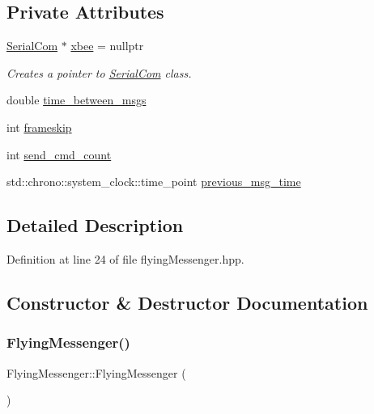 \subsection*{Private Attributes}
\begin{DoxyCompactItemize}
\item 
\hyperlink{class_serial_com}{Serial\+Com} $\ast$ \hyperlink{class_flying_messenger_a419820a45ea2bc496c10bf36b7b49033}{xbee} = nullptr
\begin{DoxyCompactList}\small\item\em Creates a pointer to \hyperlink{class_serial_com}{Serial\+Com} class. \end{DoxyCompactList}\item 
double \hyperlink{class_flying_messenger_a78023f5c0e3ee9242e0101d40f2a0d3c}{time\+\_\+between\+\_\+msgs}
\item 
int \hyperlink{class_flying_messenger_af2bf887194a8483cbadb5e27d2ec6b58}{frameskip}
\item 
int \hyperlink{class_flying_messenger_ac9ea18cccb4b2495daa5f90ba5aff1ab}{send\+\_\+cmd\+\_\+count}
\item 
std\+::chrono\+::system\+\_\+clock\+::time\+\_\+point \hyperlink{class_flying_messenger_af8611988cd9ba1712ae9e18c7adf0e6c}{previous\+\_\+msg\+\_\+time}
\end{DoxyCompactItemize}


\subsection{Detailed Description}


Definition at line 24 of file flying\+Messenger.\+hpp.



\subsection{Constructor \& Destructor Documentation}
\mbox{\label{class_flying_messenger_af9b7f5eb0e17e3c3cbf41ce14554f19b}} 
\subsubsection{\texorpdfstring{Flying\+Messenger()}{FlyingMessenger()}}
{\footnotesize\ttfamily Flying\+Messenger\+::\+Flying\+Messenger (\begin{DoxyParamCaption}{ }\end{DoxyParamCaption})}



